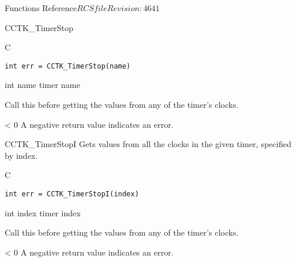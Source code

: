 \begin{cactuspart}{ Functions Reference}{$RCSfile$}{$Revision: 4641 $}
\begin{FunctionDescription}{CCTK\_TimerStop}
\begin{SynopsisSection}
\begin{Synopsis}{C}
\begin{verbatim}
int err = CCTK_TimerStop(name)
\end{verbatim}
\end{Synopsis}
\end{SynopsisSection}

\begin{ParameterSection}
\begin{Parameter} {int name}
timer name
\end{Parameter}
\end{ParameterSection}

\begin{Discussion}
Call this before getting the values from any of the timer's clocks.
\end{Discussion}

\begin{ErrorSection}
\begin{Error}{< 0}
A negative return value indicates an error.
\end{Error}
\end{ErrorSection}
\end{FunctionDescription}

\begin{FunctionDescription}{CCTK\_TimerStopI}
\label{CCTK-TimerStopI}
Gets values from all the clocks in the
given timer, specified by index.

\begin{SynopsisSection}
\begin{Synopsis}{C}
\begin{verbatim}
int err = CCTK_TimerStopI(index)
\end{verbatim}
\end{Synopsis}
\end{SynopsisSection}

\begin{ParameterSection}
\begin{Parameter} {int index}
timer index
\end{Parameter}
\end{ParameterSection}

\begin{Discussion}
Call this before getting the values from any of the timer's clocks.
\end{Discussion}

\begin{ErrorSection}
\begin{Error}{< 0}
A negative return value indicates an error.
\end{Error}
\end{ErrorSection}
\end{FunctionDescription}



\end{cactuspart}

